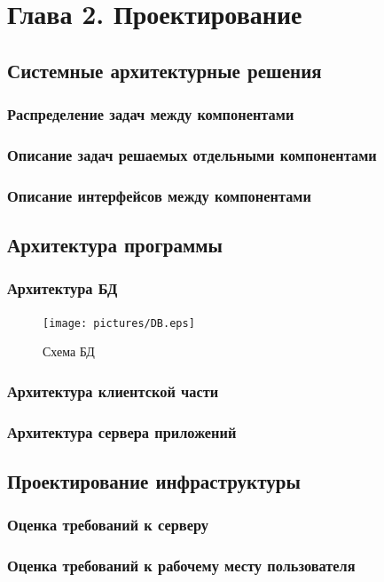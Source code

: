 \documentclass[utf8,usehyperref,12pt]{G7-32}
\begin{document}
\chapter{Глава 2. Проектирование}
\section{Системные архитектурные решения}
\subsection{Распределение задач между компонентами}

\subsection{Описание задач решаемых отдельными компонентами}
\subsection{Описание интерфейсов между компонентами}

\section{Архитектура программы}
\subsection{Архитектура БД}
\begin{figure}[ht]
   \centering%
   \texttt{[image: pictures/DB.eps]}
   \caption{Схема БД}\label{fig:db_scheme}
 \end{figure}
\subsection{Архитектура клиентской части}
\subsection{Архитектура сервера приложений}
\section{Проектирование инфраструктуры}
\subsection{Оценка требований к серверу}
\subsection{Оценка требований к рабочему месту пользователя}
\end{document}
